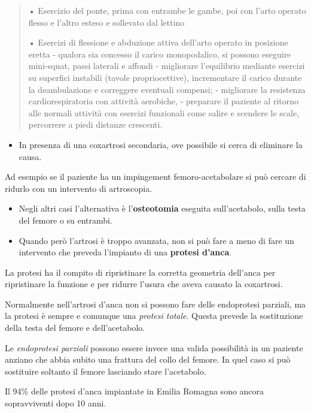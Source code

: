 \documentclass[]{article}
\begin{document}
\begin{quote}
• Esercizio del ponte, prima con entrambe le gambe, poi con l'arto
operato flesso e l'altro esteso e sollevato dal lettino

• Esercizi di flessione e abduzione attiva dell'arto operato in
posizione eretta - qualora sia concesso il carico monopodalico, si
possono eseguire mini-squat, passi laterali e affondi - migliorare
l'equilibrio mediante esercizi su superfici instabili (tavole
propriocettive), incrementare il carico durante la deambulazione e
correggere eventuali compensi; - migliorare la resistenza
cardiorespiratoria con attività aerobiche, - preparare il paziente al
ritorno alle normali attività con esercizi funzionali come salire e
scendere le scale, percorrere a piedi distanze crescenti.
\end{quote}

\begin{itemize}
\item
  In presenza di una coxartrosi secondaria, ove possibile si cerca di
  eliminare la causa.
\end{itemize}

Ad esempio se il paziente ha un impingement femoro-acetabolare si può
cercare di ridurlo con un intervento di artroscopia.

\begin{itemize}
\item
  Negli altri casi l'alternativa è l'\textbf{osteotomia} eseguita
  sull'acetabolo, sulla testa del femore o su entrambi.
\item
  Quando però l'artrosi è troppo avanzata, non si può fare a meno di
  fare un intervento che preveda l'impianto di una \textbf{protesi
  d'anca}.
\end{itemize}

La protesi ha il compito di ripristinare la corretta geometria dell'anca
per ripristinare la funzione e per ridurre l'usura che aveva causato la
coxartrosi.

Normalmente nell'artrosi d'anca non si possono fare delle endoprotesi
parziali, ma la protesi è sempre e comunque una \emph{protesi totale}.
Questa prevede la sostituzione della testa del femore e dell'acetabolo.

Le \emph{endoprotesi parziali} possono essere invece una valida
possibilità in un paziente anziano che abbia subito una frattura del
collo del femore. In quel caso si può sostituire soltanto il femore
lasciando stare l'acetabolo.

Il 94\% delle protesi d'anca impiantate in Emilia Romagna sono ancora
sopravviventi dopo 10 anni.
\end{document}
